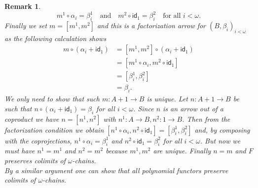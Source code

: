 \documentclass[letterpaper, 11pt, oneside]{memoir}
\theoremstyle{myteo}
\newtheorem{remark}[theorem]{Remark}
\numberwithin{equation}{section}
\newcommand{\id}{\textsf{id}}
\begin{document}
\begin{remark}
  \begin{equation*}
    m^1 \circ \alpha_i = \beta_i^1 \quad \text{and} \quad m^2 \circ \id_1 = \beta_i^2 \quad \text{for all \(i<\omega\)}.
  \end{equation*}
  Finally we set \(m = [m^1, m^2]\) and this is a factorization arrow for \((B, \beta_i)_{i<\omega}\) as the following calculation shows
  \begin{align*}
    m \circ (\alpha_i + \id_1) &= [m^1, m^2] \circ (\alpha_i + \id_1)\\
                      &= [m^1 \circ \alpha_i, m^2 \circ \id_1]\\
                      &= [\beta_i^1, \beta_i^2]\\
                      &= \beta_i.
  \end{align*}
  We only need to show that such \(m:A + 1 \to B\) is unique.
  Let \(n: A + 1 \to B\) be such that \(n \circ (\alpha_i + \id_1) = \beta_i\) for all \(i<\omega\).
  Since \(n\) is an arrow out of a coproduct we have \(n = [n^1, n^2]\) with \(n^1:A \to B, n^2:1 \to B\).
  Then from the factorization condition we obtain \([n^1 \circ \alpha_i, n^2 \circ \id_1] = [\beta_i^1, \beta_i^2]\) and, by composing with the coprojections, \(n^1 \circ \alpha_i = \beta_i^1\) and \(n^2 \circ \id_1 = \beta_i^2\) for all \(i < \omega\).
  But now we must have \(n^1 = m^1\) and \(n^2 = m^2\) because \(m^1, m^2\) are unique.
  Finally \(n = m\) and \(F\) preserves colimits of \(\omega\)-chains.\\

  By a similar argument one can show that all polynomial functors preserve colimits of \(\omega\)-chains.
\end{remark}
\end{document}
